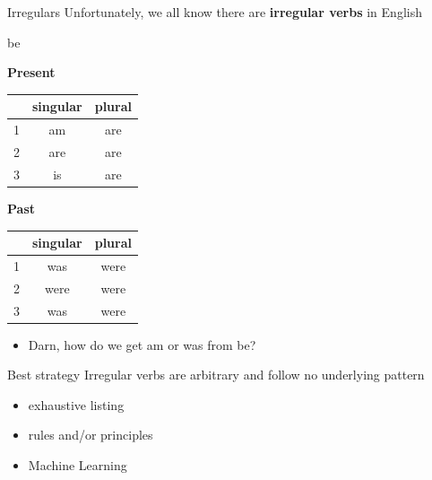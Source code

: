 \documentclass[10pt, compress]{beamer}
\begin{document}
\begin{frame}{Irregulars}
	Unfortunately, we all know there are {\bf irregular verbs} in English

	\begin{table}
		{\sc be} \\
		\begin{multicols}{2}

			{\bf Present}	\\
			\begin{tabular}{|r|cc|}
				\toprule
					&	singular	&	plural	\\
				\midrule
				1	&	am 	&	are 	\\
				2	&	are 	&	are 	\\
				3	&	is &	are 	\\
				\bottomrule
			\end{tabular}

			{\bf Past}	\\
			\begin{tabular}{|r|cc|}
				\toprule
					&	singular	&	plural	\\
				\midrule
				1	&	was 	&	were 	\\
				2	&	were 	&	were 	\\
				3	&	was &	were 	\\
				\bottomrule
			\end{tabular}
		\end{multicols}
	\end{table}

	\pause

	\begin{itemize}
		\item Darn, how do we get \alert{am} or \alert{was} from \alert{be}?
	\end{itemize}
\end{frame}

\begin{frame}{Best strategy}
	Irregular verbs are arbitrary and follow no underlying pattern
	\pause
	\begin{itemize}
		\item exhaustive listing
		\item rules and/or principles
		\item Machine Learning
	\end{itemize}

\end{frame}
\end{document}
